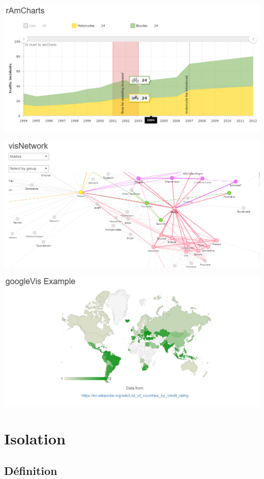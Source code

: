 \documentclass[]{article}
\begin{document}
\includegraphics{img/ramcharts.png}

\includegraphics{img/visnetwork.png}

\includegraphics{img/ggvis.png}

\section{Isolation}\label{isolation}

\subsection{Définition}\label{definition}
\end{document}
